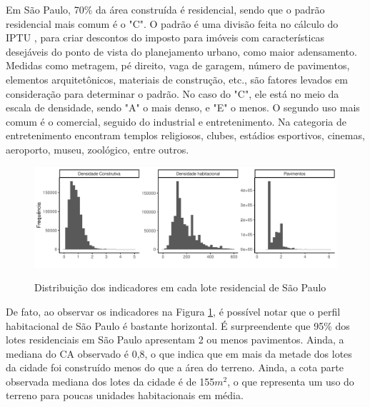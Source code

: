 Em São Paulo, 70\% da área construída é residencial, sendo que o padrão residencial mais comum é o "C". O padrão é uma divisão feita no cálculo do IPTU \cite{lei10235_1986}, para criar descontos do imposto para imóveis com características desejáveis do ponto de vista do planejamento urbano, como maior adensamento. Medidas como metragem, pé direito, vaga de garagem, número de pavimentos, elementos arquitetônicos, materiais de construção, etc., são fatores levados em consideração para determinar o padrão. No caso do "C", ele está no meio da escala de densidade, sendo "A" o mais denso, e "E" o menos. O segundo uso mais comum é o comercial, seguido do industrial e entretenimento. Na categoria de entretenimento encontram templos religiosos, clubes, estádios esportivos, cinemas, aeroporto, museu, zoológico, entre outros.

\begin{figure}[h]
    \centering
    \caption{Distribuição dos indicadores em cada lote residencial de São Paulo}
    \includegraphics[width = \linewidth]{imagens/indicadores.pdf}
    \label{fig:histogramas}
\end{figure}

De fato, ao observar os indicadores na Figura \ref{fig:histogramas}, é possível notar que o perfil habitacional de São Paulo é bastante horizontal. É surpreendente que 95\% dos lotes residenciais em São Paulo apresentam 2 ou menos pavimentos. Ainda, a mediana do CA observado é 0,8, o que indica que em mais da metade dos lotes da cidade foi construído menos do que a área do terreno. Ainda, a cota parte observada mediana dos lotes da cidade é de 155$m^2$, o que representa um uso do terreno para poucas unidades habitacionais em média. 

